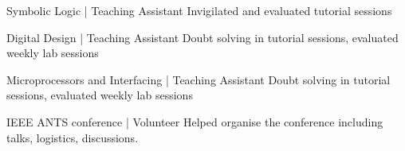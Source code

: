 \begin{projects}

\projecta
	{Symbolic Logic | Teaching Assistant}{} {}
	{Invigilated and evaluated tutorial sessions}
	
 \projecta
	{Digital Design | Teaching Assistant}{} {}
	{Doubt solving in tutorial sessions, evaluated weekly lab sessions}
	
\projecta
	{Microprocessors and Interfacing | Teaching Assistant}{} {}
	{Doubt solving in tutorial sessions, evaluated weekly lab sessions}
	
\projecta
	{IEEE ANTS conference | Volunteer}{} {}
	{Helped organise the conference including talks, logistics, discussions. }
 \end{projects}
 
 
